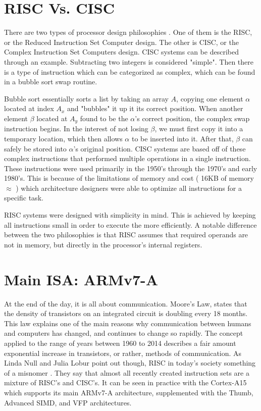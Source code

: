 \documentclass[12pt]{scrreprt}
\begin{document}
	\section{RISC Vs. CISC}

	There are two types of processor design philosophies \autocite[5]{riscGuide}.
	One of them is the RISC, or the Reduced Instruction Set Computer design.
	The other is CISC, or the Complex Instruction Set Computers design.
	CISC systems can be described through an example.
	Subtracting two integers is considered "simple".
	Then there is a type of instruction which can be categorized as complex, which can be found in a bubble sort swap routine.

	
	Bubble sort essentially sorts a list by taking an array $ A $, copying one element $ \alpha $ located at index $ A_{x} $ and "bubbles" it up it its correct position.
	When another element $\beta$ located at $ A_{y} $ found to be the $ \alpha $'s correct position, the complex swap instruction begins.
	In the interest of not losing $\beta$, we must first copy it into a temporary location, which then allows $\alpha$ to be inserted into it.
	After that, $\beta$ can safely be stored into $\alpha$'s original position.
	CISC systems are based off of these complex instructions that performed multiple operations in a single instruction.
	These instructions were used primarily in the 1950's through the 1970's and early 1980's.
	This is because of the limitations of memory and cost ( 16KB of memory $\approx$  ) which architecture designers were able to optimize all instructions for a specific task.

	RISC systems were designed with simplicity in mind.
	This is achieved by keeping all instructions small in order to execute the more efficiently.
	A notable difference between the two philosophies is that RISC assumes that required operands are not in memory, but directly in the processor's internal registers.

	\section{Main ISA: ARMv7-A}

	At the end of the day, it is all about communication.
	Moore's Law, states that the density of transistors on an integrated circuit is doubling every 18 months.
	This law explains one of the main reasons why communication between humans and computers has changed, and continues to change so rapidly.
	The concept applied to the range of years between 1960 to 2014 describes a fair amount exponential increase in transistors, or rather, methods of communication.
	As Linda Null and Julia Lobur point out though, RISC in today's society something of a misnomer \autocite[327]{classtext}.
	They say that almost all recently created instruction sets are a mixture of RISC's and CISC's.
	It can be seen in practice with the Cortex-A15 which supports its main ARMv7-A architecture, supplemented with the Thumb, Advanced SIMD, and VFP architectures.
\end{document}
